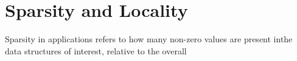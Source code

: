 \section{Sparsity and Locality}\label{sec:sga-sparcity}

Sparsity in applications refers to how many non-zero values are present inthe data structures of interest, relative to the overall  